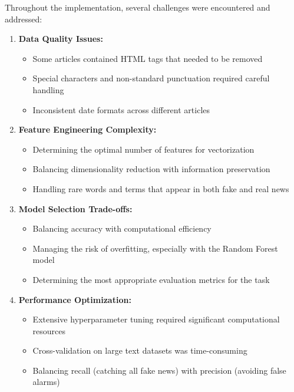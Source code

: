 \documentclass[12pt]{article}
\begin{document}
Throughout the implementation, several challenges were encountered and addressed:

\begin{enumerate}
    \item \textbf{Data Quality Issues:}
    \begin{itemize}
        \item Some articles contained HTML tags that needed to be removed
        \item Special characters and non-standard punctuation required careful handling
        \item Inconsistent date formats across different articles
    \end{itemize}
    
    \item \textbf{Feature Engineering Complexity:}
    \begin{itemize}
        \item Determining the optimal number of features for vectorization
        \item Balancing dimensionality reduction with information preservation
        \item Handling rare words and terms that appear in both fake and real news
    \end{itemize}
    
    \item \textbf{Model Selection Trade-offs:}
    \begin{itemize}
        \item Balancing accuracy with computational efficiency
        \item Managing the risk of overfitting, especially with the Random Forest model
        \item Determining the most appropriate evaluation metrics for the task
    \end{itemize}
    
    \item \textbf{Performance Optimization:}
    \begin{itemize}
        \item Extensive hyperparameter tuning required significant computational resources
        \item Cross-validation on large text datasets was time-consuming
        \item Balancing recall (catching all fake news) with precision (avoiding false alarms)
    \end{itemize}
\end{enumerate}
\end{document}
